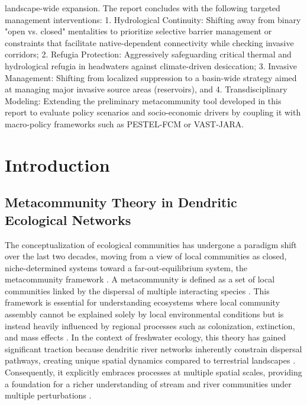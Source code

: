\documentclass[11pt,a4paper]{article}
\begin{document}
landscape-wide expansion. The report concludes with the following targeted management interventions: 1. Hydrological Continuity: Shifting away from binary "open vs. closed" mentalities to prioritize selective barrier management or constraints that facilitate native-dependent connectivity while checking invasive corridors; 2. Refugia Protection: Aggressively safeguarding critical thermal and hydrological refugia in headwaters against climate-driven desiccation; 3. Invasive Management: Shifting from localized suppression to a basin-wide strategy aimed at managing major invasive source areas (reservoirs), and 4. Transdisciplinary Modeling: Extending the preliminary metacommunity tool developed in this report to evaluate policy scenarios and socio-economic drivers by coupling it with macro-policy frameworks such as PESTEL-FCM or VAST-JARA.

\newpage


\section{Introduction}

\subsection{Metacommunity Theory in Dendritic Ecological Networks}
The conceptualization of ecological communities has undergone a paradigm shift over the last two decades, moving from a view of local communities as closed, niche-determined systems toward a far-out-equilibrium system, the metacommunity framework \cite{leibold2004metacommunity}. A metacommunity is defined as a set of local communities linked by the dispersal of multiple interacting species \cite{gravel_trophic_2011, Larsenetal2021}. This framework is essential for understanding ecosystems where local community assembly cannot be explained solely by local environmental conditions but is instead heavily influenced by regional processes such as colonization, extinction, and mass effects \cite{leibold2004metacommunity, Leibold2020}. In the context of freshwater ecology, this theory has gained significant traction because dendritic river networks inherently constrain dispersal pathways, creating unique spatial dynamics compared to terrestrial landscapes \cite{brown2011metacommunity, altermatt2013dendritic}. Consequently, it explicitly embraces processes at multiple spatial scales, providing a foundation for a richer understanding of stream and river communities under multiple perturbations \cite{PerkinGido2012, tonkin2018preparing}.
\end{document}
